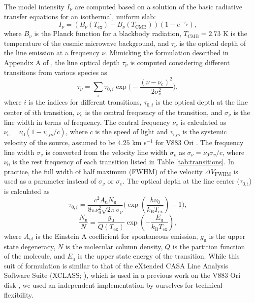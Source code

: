 \documentclass[linenumbers, twocolumn, twocolappendix, astrosymb, times]{aastex631}
\begin{document}
The model intensity $I_\nu$ are computed based on a solution of the basic radiative transfer equations for an isothermal, uniform slab:
\begin{equation}
    I_\nu = (B_\nu(T_\mathrm{ex}) - B_\nu(T_\mathrm{CMB})) (1 - e^{-\tau_\nu}),
\end{equation}
where $B_\nu$ is the Planck function for a blackbody radiation, $T_\mathrm{CMB} = 2.73$ K is the temperature of the cosmic microwave background, and $\tau_\nu$ is the optical depth of the line emission at a frequency $\nu$. Mimicking the formulation described in Appendix A of \citet{Yamato2022}, the line optical depth $\tau_\nu$ is computed considering different transitions from various species as
\begin{equation}
    \tau_\nu = \sum_{i}\tau_{0, i} \exp\bigg(-\frac{(\nu - \nu_\mathrm{c})^2}{2 \sigma_\nu^2}\bigg),
\end{equation}
where $i$ is the indices for different transitions, $\tau_{0, i}$ is the optical depth at the line center of $i$th transition, $\nu_\mathrm{c}$ is the central frequency of the transition, and $\sigma_\nu$ is the line width in terms of frequency. The central frequency $\nu_\mathrm{c}$ is calculated as $\nu_\mathrm{c} = \nu_0 (1 - v_\mathrm{sys}/c)$, where $c$ is the speed of light and $v_\mathrm{sys}$ is the systemic velocity of the source, assumed to be $4.25$ km s$^{-1}$ for V883 Ori \citep{Tobin2023}. The frequency line width $\sigma_\nu$ is converted from the velocity line width $\sigma_v$ as $\sigma_\nu = \nu_0 \sigma_v / c$, where $\nu_0$ is the rest frequency of each transition listed in Table \ref{tab:transitions}. In practice, the full width of half maximum (FWHM) of the velocity $\Delta V_\mathrm{FWHM}$ is used as a parameter instead of $\sigma_\nu$ or $\sigma_v$. The optical depth at the line center ($\tau_\mathrm{0, i}$) is calculated as
\begin{equation}
    \tau_{0, i} = \frac{c^2A_\mathrm{u}N_\mathrm{u}}{8\pi\nu_0^2\sqrt{2\pi}\sigma_\nu}\Bigg(\exp\left(\frac{h\nu_0}{k_\mathrm{B}T_\mathrm{ex}}\right) - 1\Bigg),
\end{equation}
\begin{equation}
    \frac{N_\mathrm{u}}{N} = \frac{g_\mathrm{u}}{Q(T_\mathrm{ex})}\exp\left(-\frac{E_\mathrm{u}}{k_\mathrm{B}T_\mathrm{ex}}\right),
\end{equation}
where $A_\mathrm{ul}$ is the Einstein A coefficient for spontaneous emission, $g_\mathrm{u}$ is the upper state degeneracy, $N$ is the molecular column density, $Q$ is the partition function of the molecule, and $E_\mathrm{u}$ is the upper state energy of the transition. While this suit of formulation is similar to that of the eXtended CASA Line Analysis Software Suite (XCLASS; \citealt{Moller2017}), which is used in a previous work on the V883 Ori disk \citep{Lee2019}, we used an independent implementation by ourselves for technical flexibility.
\end{document}
